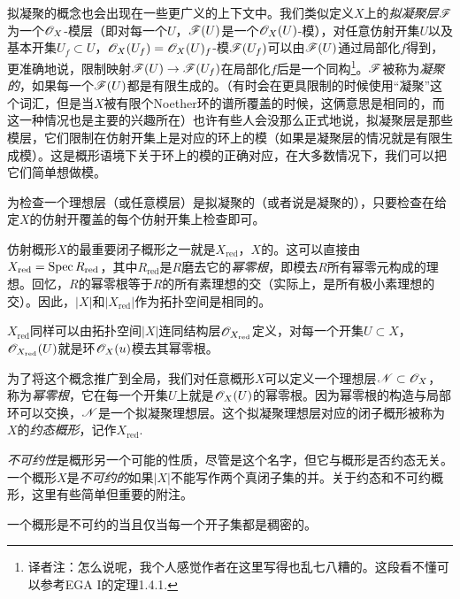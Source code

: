 拟凝聚的概念也会出现在一些更广义的上下文中。我们类似定义$X$上的\textit{拟凝聚层}$\mathscr{F}$为一个$\mathscr{O}_X$-模层（即对每一个$U$，$\mathscr{F}(U)$是一个$\mathscr{O}_X(U)$-模），对任意仿射开集$U$以及基本开集$U_f\subset U$，$\mathscr{O}_X(U_f)=\mathscr{O}_X(U)_f$-模$\mathscr{F}(U_f)$可以由$\mathscr{F}(U)$通过局部化$f$得到，更准确地说，限制映射$\mathscr{F}(U)\to \mathscr{F}(U_f)$在局部化$f$后是一个同构\footnote{译者注：怎么说呢，我个人感觉作者在这里写得也乱七八糟的。这段看不懂可以参考EGA I的定理1.4.1. }。$\mathscr{F}$被称为\textit{凝聚的}，如果每一个$\mathscr{F}(U)$都是有限生成的。（有时会在更具限制的时候使用“凝聚”这个词汇，但是当$X$被有限个Noether环的谱所覆盖的时候，这俩意思是相同的，而这一种情况也是主要的兴趣所在）也许有些人会没那么正式地说，拟凝聚层是那些模层，它们限制在仿射开集上是对应的环上的模（如果是凝聚层的情况就是有限生成模）。这是概形语境下关于环上的模的正确对应，在大多数情况下，我们可以把它们简单想做模。

\begin{exe}\label{exe:1.28}
为检查一个理想层（或任意模层）是拟凝聚的（或者说是凝聚的），只要检查在给定$X$的仿射开覆盖的每个仿射开集上检查即可。
\end{exe}

仿射概形$X$的最重要闭子概形之一就是$X_{\text{red}}$，$X$的。这可以直接由$X_{\text{red}}=\operatorname{Spec} R_{\text{red}}$，其中$R_\text{red}$是$R$磨去它的\textit{幂零根}，即模去$R$所有幂零元构成的理想。回忆，$R$的幂零根等于$R$的所有素理想的交（实际上，是所有极小素理想的交）。因此，$|X|$和$|X_\text{red}|$作为拓扑空间是相同的。

\begin{exe}\label{exe:1.29}
$X_\text{red}$同样可以由拓扑空间$|X|$连同结构层$\mathscr{O}_{X_\text{red}}$定义，对每一个开集$U\subset X$，$\mathscr{O}_{X_\text{red}}(U)$就是环$\mathscr{O}_X(u)$模去其幂零根。
\end{exe}

为了将这个概念推广到全局，我们对任意概形$X$可以定义一个理想层$\mathscr{N}\subset \mathscr{O}_X$，称为\textit{幂零根}，它在每一个开集$U$上就是$\mathscr{O}_X(U)$的幂零根。因为幂零根的构造与局部环可以交换，$\mathscr{N}$是一个拟凝聚理想层。这个拟凝聚理想层对应的闭子概形被称为$X$的\textit{约态概形}，记作$X_\text{red}$.

\textit{不可约性}是概形另一个可能的性质，尽管是这个名字，但它与概形是否约态无关。一个概形$X$是\textit{不可约的}如果$|X|$不能写作两个真闭子集的并。关于约态和不可约概形，这里有些简单但重要的附注。

\begin{exe}
	一个概形是不可约的当且仅当每一个开子集都是稠密的。
\end{exe}

